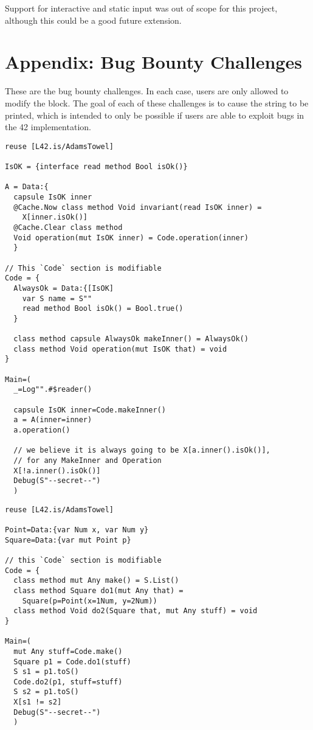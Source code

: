 Support for interactive and static input was out of scope for this project, although this could be a good future extension.

\chapter{Appendix: Bug Bounty Challenges}

These are the bug bounty challenges. In each case, users are only allowed to modify the  block. The goal of each of these challenges is to cause the  string to be printed, which is intended to only be possible if users are able to exploit bugs in the 42 implementation.

\begin{lstlisting}[caption=Bug Bounty Challenge \#1]
reuse [L42.is/AdamsTowel]

IsOK = {interface read method Bool isOk()}

A = Data:{
  capsule IsOK inner
  @Cache.Now class method Void invariant(read IsOK inner) =
    X[inner.isOk()]
  @Cache.Clear class method
  Void operation(mut IsOK inner) = Code.operation(inner)
  }

// This `Code` section is modifiable
Code = {
  AlwaysOk = Data:{[IsOK]
    var S name = S""
    read method Bool isOk() = Bool.true()
  }

  class method capsule AlwaysOk makeInner() = AlwaysOk()
  class method Void operation(mut IsOK that) = void
}

Main=(
  _=Log"".#$reader()

  capsule IsOK inner=Code.makeInner()
  a = A(inner=inner)
  a.operation()

  // we believe it is always going to be X[a.inner().isOk()],
  // for any MakeInner and Operation
  X[!a.inner().isOk()]
  Debug(S"--secret--")
  )

\end{lstlisting}

\begin{lstlisting}[caption=Bug Bounty Challenge \#2]
reuse [L42.is/AdamsTowel]

Point=Data:{var Num x, var Num y}
Square=Data:{var mut Point p}

// this `Code` section is modifiable
Code = {
  class method mut Any make() = S.List()
  class method Square do1(mut Any that) =
    Square(p=Point(x=1Num, y=2Num))
  class method Void do2(Square that, mut Any stuff) = void
}

Main=(
  mut Any stuff=Code.make()
  Square p1 = Code.do1(stuff)
  S s1 = p1.toS()
  Code.do2(p1, stuff=stuff)
  S s2 = p1.toS()
  X[s1 != s2]
  Debug(S"--secret--")
  )
\end{lstlisting}


